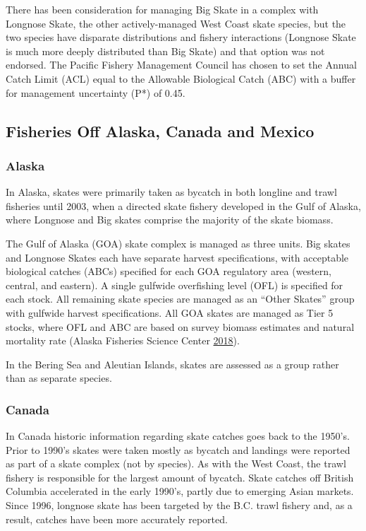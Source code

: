 \documentclass[12pt,]{article}
\begin{document}
There has been consideration for managing Big Skate in a complex with
Longnose Skate, the other actively-managed West Coast skate species, but
the two species have disparate distributions and fishery interactions
(Longnose Skate is much more deeply distributed than Big Skate) and that
option was not endorsed. The Pacific Fishery Management Council has
chosen to set the Annual Catch Limit (ACL) equal to the Allowable
Biological Catch (ABC) with a buffer for management uncertainty (P*) of
0.45.

\hypertarget{fisheries-off-alaska-canada-and-mexico}{%
\subsection{Fisheries Off Alaska, Canada and
Mexico}\label{fisheries-off-alaska-canada-and-mexico}}

\hypertarget{alaska}{%
\subsubsection{Alaska}\label{alaska}}

In Alaska, skates were primarily taken as bycatch in both longline and
trawl fisheries until 2003, when a directed skate fishery developed in
the Gulf of Alaska, where Longnose and Big skates comprise the majority
of the skate biomass.

The Gulf of Alaska (GOA) skate complex is managed as three units. Big
skates and Longnose Skates each have separate harvest specifications,
with acceptable biological catches (ABCs) specified for each GOA
regulatory area (western, central, and eastern). A single gulfwide
overfishing level (OFL) is specified for each stock. All remaining skate
species are managed as an ``Other Skates'' group with gulfwide harvest
specifications. All GOA skates are managed as Tier 5 stocks, where OFL
and ABC are based on survey biomass estimates and natural mortality rate
(Alaska Fisheries Science Center
\protect\hyperlink{ref-AFSC2018}{2018}).

In the Bering Sea and Aleutian Islands, skates are assessed as a group
rather than as separate species.

\hypertarget{canada}{%
\subsubsection{Canada}\label{canada}}

In Canada historic information regarding skate catches goes back to the
1950's. Prior to 1990's skates were taken mostly as bycatch and landings
were reported as part of a skate complex (not by species). As with the
West Coast, the trawl fishery is responsible for the largest amount of
bycatch. Skate catches off British Columbia accelerated in the early
1990's, partly due to emerging Asian markets. Since 1996, longnose skate
has been targeted by the B.C. trawl fishery and, as a result, catches
have been more accurately reported.
\end{document}
